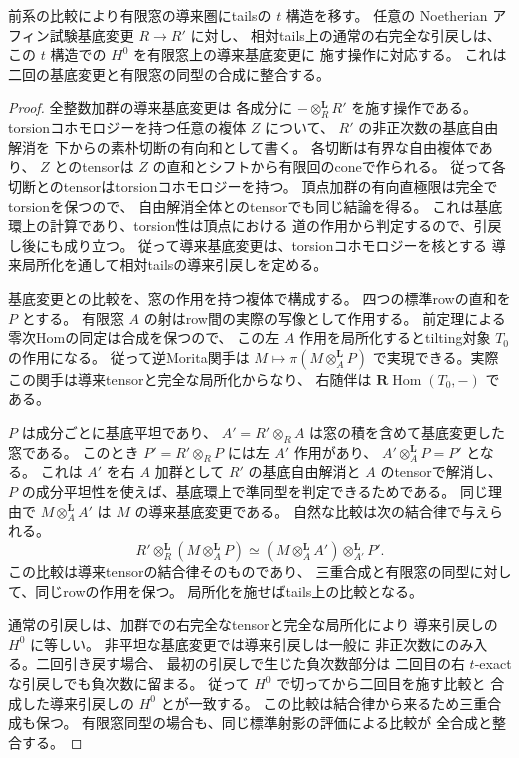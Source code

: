 \begin{corollary}[全avatarのtails比較における非平坦基底変更]
\label{cor:qa-avatar-tails-base-change}
前系の比較により有限窓の導来圏にtailsの $t$ 構造を移す。
任意の Noetherian アフィン試験基底変更 $R\to R'$ に対し、
相対tails上の通常の右完全な引戻しは、
この $t$ 構造での $H^0$ を有限窓上の導来基底変更に
施す操作に対応する。
これは二回の基底変更と有限窓の同型の合成に整合する。
\end{corollary}
\begin{proof}
全整数加群の導来基底変更は
各成分に $-\otimes_R^{\mathbf L}R'$ を施す操作である。
torsionコホモロジーを持つ任意の複体 $Z$ について、
$R'$ の非正次数の基底自由解消を
下からの素朴切断の有向和として書く。
各切断は有界な自由複体であり、
$Z$ とのtensorは $Z$ の直和とシフトから有限回のconeで作られる。
従って各切断とのtensorはtorsionコホモロジーを持つ。
頂点加群の有向直極限は完全でtorsionを保つので、
自由解消全体とのtensorでも同じ結論を得る。
これは基底環上の計算であり、torsion性は頂点における
道の作用から判定するので、引戻し後にも成り立つ。
従って導来基底変更は、torsionコホモロジーを核とする
導来局所化を通して相対tailsの導来引戻しを定める。

基底変更との比較を、窓の作用を持つ複体で構成する。
四つの標準rowの直和を $P$ とする。
有限窓 $A$ の射はrow間の実際の写像として作用する。
前定理による零次Homの同定は合成を保つので、
この左 $A$ 作用を局所化するとtilting対象 $T_0$ の作用になる。
従って逆Morita関手は $M\mapsto\pi(M\otimes_A^{\mathbf L}P)$
で実現できる。実際この関手は導来tensorと完全な局所化からなり、
右随伴は $\mathbf R\operatorname{Hom}(T_0,-)$ である。

$P$ は成分ごとに基底平坦であり、
$A'=R'\otimes_R A$ は窓の積を含めて基底変更した窓である。
このとき $P'=R'\otimes_R P$ には左 $A'$ 作用があり、
$A'\otimes_A^{\mathbf L}P=P'$ となる。
これは $A'$ を右 $A$ 加群として
$R'$ の基底自由解消と $A$ のtensorで解消し、
$P$ の成分平坦性を使えば、基底環上で準同型を判定できるためである。
同じ理由で $M\otimes_A^{\mathbf L}A'$ は
$M$ の導来基底変更である。
自然な比較は次の結合律で与えられる。
\[
 R'\otimes_R^{\mathbf L}(M\otimes_A^{\mathbf L}P)
 \simeq
 (M\otimes_A^{\mathbf L}A')\otimes_{A'}^{\mathbf L}P'.
\]
この比較は導来tensorの結合律そのものであり、
三重合成と有限窓の同型に対して、同じrowの作用を保つ。
局所化を施せばtails上の比較となる。

通常の引戻しは、加群での右完全なtensorと完全な局所化により
導来引戻しの $H^0$ に等しい。
非平坦な基底変更では導来引戻しは一般に
非正次数にのみ入る。二回引き戻す場合、
最初の引戻しで生じた負次数部分は
二回目の右 $t$-exact な引戻しでも負次数に留まる。
従って $H^0$ で切ってから二回目を施す比較と
合成した導来引戻しの $H^0$ とが一致する。
この比較は結合律から来るため三重合成も保つ。
有限窓同型の場合も、同じ標準射影の評価による比較が
全合成と整合する。
\end{proof}

